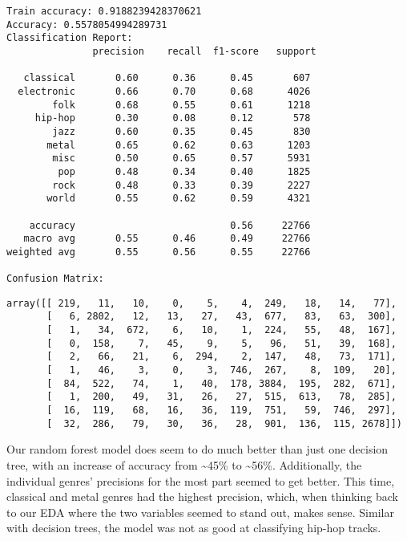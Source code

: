 \documentclass[11pt]{article}
\makeatletter
\newcommand{\boxspacing}{\kern\kvtcb@left@rule\kern\kvtcb@boxsep}
\newcommand{\prompt}[4]{
        {\ttfamily\llap{{\color{#2}[#3]:\hspace{3pt}#4}}\vspace{-\baselineskip}}
    }
\makeatother
\begin{document}
    \begin{Verbatim}[commandchars=\\\{\}]
Train accuracy: 0.9188239428370621
Accuracy: 0.5578054994289731
Classification Report:
               precision    recall  f1-score   support

   classical       0.60      0.36      0.45       607
  electronic       0.66      0.70      0.68      4026
        folk       0.68      0.55      0.61      1218
     hip-hop       0.30      0.08      0.12       578
        jazz       0.60      0.35      0.45       830
       metal       0.65      0.62      0.63      1203
        misc       0.50      0.65      0.57      5931
         pop       0.48      0.34      0.40      1825
        rock       0.48      0.33      0.39      2227
       world       0.55      0.62      0.59      4321

    accuracy                           0.56     22766
   macro avg       0.55      0.46      0.49     22766
weighted avg       0.55      0.56      0.55     22766

Confusion Matrix:
    \end{Verbatim}

            \begin{tcolorbox}[breakable, size=fbox, boxrule=.5pt, pad at break*=1mm, opacityfill=0]
\prompt{Out}{outcolor}{46}{\boxspacing}
\begin{Verbatim}[commandchars=\\\{\}]
array([[ 219,   11,   10,    0,    5,    4,  249,   18,   14,   77],
       [   6, 2802,   12,   13,   27,   43,  677,   83,   63,  300],
       [   1,   34,  672,    6,   10,    1,  224,   55,   48,  167],
       [   0,  158,    7,   45,    9,    5,   96,   51,   39,  168],
       [   2,   66,   21,    6,  294,    2,  147,   48,   73,  171],
       [   1,   46,    3,    0,    3,  746,  267,    8,  109,   20],
       [  84,  522,   74,    1,   40,  178, 3884,  195,  282,  671],
       [   1,  200,   49,   31,   26,   27,  515,  613,   78,  285],
       [  16,  119,   68,   16,   36,  119,  751,   59,  746,  297],
       [  32,  286,   79,   30,   36,   28,  901,  136,  115, 2678]])
\end{Verbatim}
\end{tcolorbox}
        
    Our random forest model does seem to do much better than just one
decision tree, with an increase of accuracy from \textasciitilde45\% to
\textasciitilde56\%. Additionally, the individual genres' precisions for
the most part seemed to get better. This time, classical and metal
genres had the highest precision, which, when thinking back to our EDA
where the two variables seemed to stand out, makes sense. Similar with
decision trees, the model was not as good at classifying hip-hop tracks.
\end{document}
